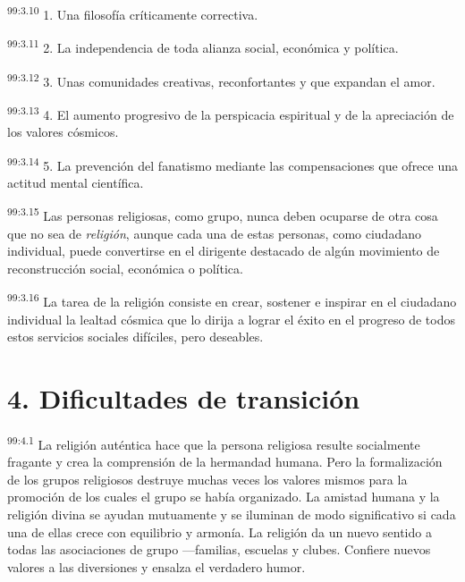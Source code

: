 \documentclass[twoside, 11pt]{book}
\begin{document}
\par
\textsuperscript{99:3.10} 1. Una filosofía críticamente correctiva.

\par
\textsuperscript{99:3.11} 2. La independencia de toda alianza social, económica y política.

\par
\textsuperscript{99:3.12} 3. Unas comunidades creativas, reconfortantes y que expandan el amor.

\par
\textsuperscript{99:3.13} 4. El aumento progresivo de la perspicacia espiritual y de la apreciación de los valores cósmicos.

\par
\textsuperscript{99:3.14} 5. La prevención del fanatismo mediante las compensaciones que ofrece una actitud mental científica.

\par
\textsuperscript{99:3.15} Las personas religiosas, como grupo, nunca deben ocuparse de otra cosa que no sea de \textit{religión}, aunque cada una de estas personas, como ciudadano individual, puede convertirse en el dirigente destacado de algún movimiento de reconstrucción social, económica o política.

\par
\textsuperscript{99:3.16} La tarea de la religión consiste en crear, sostener e inspirar en el ciudadano individual la lealtad cósmica que lo dirija a lograr el éxito en el progreso de todos estos servicios sociales difíciles, pero deseables.

\section*{4. Dificultades de transición}
\par
\textsuperscript{99:4.1} La religión auténtica hace que la persona religiosa resulte socialmente fragante y crea la comprensión de la hermandad humana. Pero la formalización de los grupos religiosos destruye muchas veces los valores mismos para la promoción de los cuales el grupo se había organizado. La amistad humana y la religión divina se ayudan mutuamente y se iluminan de modo significativo si cada una de ellas crece con equilibrio y armonía. La religión da un nuevo sentido a todas las asociaciones de grupo ---familias, escuelas y clubes. Confiere nuevos valores a las diversiones y ensalza el verdadero humor.
\end{document}
